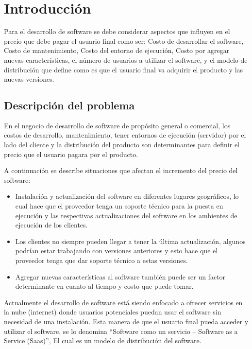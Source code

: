 \chapter{Introducción}
\noindent Para el desarrollo de software se debe considerar aspectos que influyen en el precio que debe pagar el usuario final como ser: Costo de desarrollar el software, Costo de mantenimiento, Costo del entorno de ejecución,  Costo por agregar nuevas características, el número de usuarios a utilizar el software, y el modelo de distribución que define como es que el usuario final va adquirir el producto y las nuevas versiones. 

\section{Descripción del problema}
\noindent En el negocio de desarrollo de software de propósito general o comercial, los costos de desarrollo, mantenimiento, tener  entornos de ejecución (servidor) por el lado del cliente y la distribución del producto son determinantes para definir el precio que el usuario pagara por el producto.

\noindent A continuación se describe situaciones que afectan el incremento del precio del software:

\begin{itemize}
   	\item Instalación y actualización del software en diferentes lugares geográficos, lo cual hace que el proveedor tenga un soporte técnico para la puesta en ejecución y las respectivas actualizaciones del software en los ambientes de ejecución de los clientes.
    \item Los clientes no siempre pueden llegar a tener la última actualización, algunos podrían estar trabajando con versiones anteriores y esto hace que el proveedor tenga que dar soporte técnico a estas versiones.
    \item Agregar nuevas características al software también puede ser un factor determinante en cuanto al tiempo y costo que puede tomar.

\end{itemize}

\noindent Actualmente el desarrollo de software está siendo enfocado a ofrecer servicios en la nube (internet) donde usuarios potenciales puedan usar el software sin necesidad de una instalación. Esta manera de que el usuario final pueda acceder y utilizar el software, se lo denomina “Software como un servicio – Software as a Service (Saas)”, El cual es un modelo de distribución del software.

